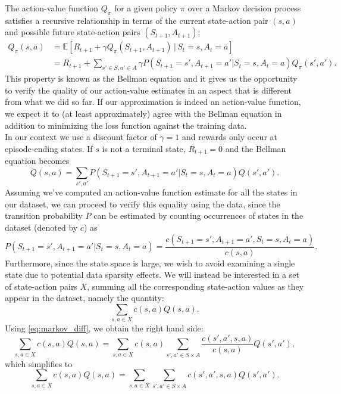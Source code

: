 \documentclass{sfuthesis}
\begin{document}
	The action-value function $Q_\pi$ for a given policy $\pi$ over a Markov decision process satisfies a recursive relationship in terms of the current state-action pair $(s,a)$ and possible future state-action pairs $(S_{t+1},A_{t+1})$: 
	\begin{align}
		Q_\pi(s,a) &= \mathbb{E} \left[  R_{t+1} + \gamma Q_{\pi}(S_{t+1}, A_{t+1}) \, | \, S_t = s, A_t = a \right]\\
		&=  R_{t+1} + \sum_{s' \in S, a' \in A} \gamma P(S_{t+1} = s', A_{t+1} = a' | S_t = s, A_t = a) Q_\pi(s',a').
	\end{align}
	This property is known as the Bellman equation \cite{sutton2018reinforcement} and it gives us the opportunity to verify the quality of our action-value estimates in an aspect that is different from what we did so far. If our approximation is indeed an action-value function, we expect it to (at least approximately) agree with the Bellman equation in addition to minimizing the loss function against the training data.\\
	In our context we use a discount factor of $\gamma = 1$ and rewards only occur at episode-ending states. If $s$ is not a terminal state, $R_{t+1} = 0$ and the Bellman equation becomes
	\begin{equation}
		Q(s,a) = \sum_{s',a'} P(S_{t+1} = s', A_{t+1} = a' | S_t = s, A_t = a) Q(s',a').
		\label{eq:markov_diff}
	\end{equation}
	Assuming we've computed an action-value function estimate for all the states in our dataset, we can proceed to verify this equality using the data, since the transition probability $P$ can be estimated by counting occurrences of states in the dataset (denoted by $c$) as
	$$P(S_{t+1} = s', A_{t+1} = a' | S_t = s, A_t = a) = \frac{c(S_{t+1} = s', A_{t+1} = a', S_t = s, A_t = a)}{c(s,a)}.$$
	Furthermore, since the state space is large, we wish to avoid examining a single state due to potential data sparsity effects. We will instead be interested in a set of state-action pairs $X$, summing all the corresponding state-action values as they appear in the dataset, namely the quantity:
	$$\sum_{s,a\in X} c(s,a)Q(s,a).$$
	Using \eqref{eq:markov_diff}, we obtain the right hand side:
	\begin{equation}
		\sum_{s,a\in X} c(s,a)Q(s,a) = \sum_{s,a\in X} c(s,a)\sum_{s',a'\in S\times A} \frac{c(s',a',s,a)}{c(s,a)} Q(s',a'),
	\end{equation}
	which simplifies to
	\begin{equation}
		\sum_{s,a\in X} c(s,a)Q(s,a) = \sum_{s,a\in X} \sum_{s',a'\in S\times A} c(s',a',s,a) Q(s',a').
		\label{eq:markov_num}
	\end{equation}
\end{document}
